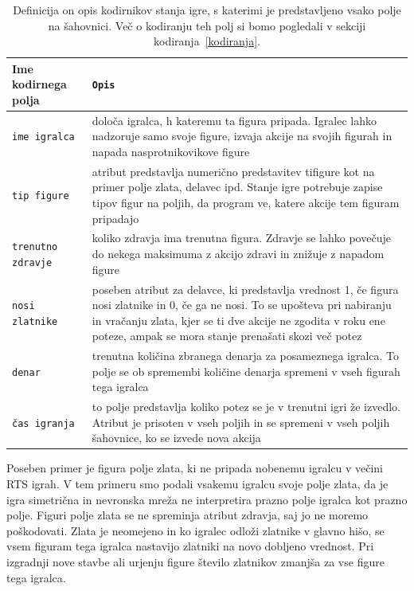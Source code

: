 \documentclass[a4paper, 12pt]{book}
\begin{document}
\begin{table}
	\begin{center}
		\begin{tabular}{p{0.2\linewidth}|p{0.8\linewidth}}
			Ime kodirnega polja    & {\tt Opis} \\ \hline
			{\tt ime igralca}      & določa igralca, h kateremu ta figura pripada. 
									 Igralec lahko nadzoruje samo svoje figure, izvaja akcije na svojih figurah in napada nasprotnikovikove figure \\
			{\tt tip figure}       & atribut predstavlja numerično predstavitev tifigure kot na primer polje zlata, delavec ipd.
									 Stanje igre potrebuje zapise tipov figur na poljih, da program ve, katere akcije tem figuram pripadajo\\
			{\tt trenutno zdravje} & koliko zdravja ima trenutna figura. 
									 Zdravje se lahko povečuje do nekega maksimuma z akcijo zdravi in znižuje z napadom figure \\
			{\tt nosi zlatnike}    & poseben atribut za delavce, ki predstavlja vrednost 1, če figura nosi zlatnike in 0, če ga ne nosi. 
									 To se upošteva pri nabiranju in vračanju zlata, kjer se ti dve akcije ne zgodita v roku ene poteze, ampak se mora stanje prenašati skozi več potez \\
			{\tt denar}            & trenutna količina zbranega denarja za posameznega igralca. 
									 To polje se ob spremembi količine denarja spremeni v vseh figurah tega igralca \\
			{\tt čas igranja}      & to polje predstavlja koliko potez se je v trenutni igri že izvedlo. 
									 Atribut je prisoten v vseh poljih in se spremeni v vseh poljih šahovnice, ko se izvede nova akcija \\
		\end{tabular}
	\end{center}
	\caption{Definicija on opis kodirnikov stanja igre, s katerimi je predstavljeno vsako polje na šahovnici. Več o kodiranju teh polj si bomo pogledali v sekciji kodiranja~\ref{kodiranja}.}
	\label{tableEncoders}
\end{table}

Poseben primer je figura polje zlata, ki ne pripada nobenemu igralcu v večini RTS igrah. 
V tem primeru smo podali vsakemu igralcu svoje polje zlata, da je igra simetrična in nevronska mreža ne interpretira prazno polje igralca kot prazno polje.
Figuri polje zlata se ne spreminja atribut zdravja, saj jo ne moremo poškodovati. 
Zlata je neomejeno in ko igralec odloži zlatnike v glavno hišo, se vsem figuram tega igralca nastavijo zlatniki na novo dobljeno vrednost. 
Pri izgradnji nove stavbe ali urjenju figure število zlatnikov zmanjša za vse figure tega igralca.
\end{document}
